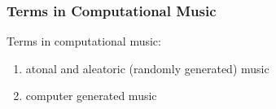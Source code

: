 \subsubsection{\hspace{0.1in} Terms in Computational Music}
\label{compmusicterms}

Terms in computational music: \vspace{-0.3cm}
\begin{enumerate} \itemsep -4pt
\item atonal and aleatoric (randomly generated) music
\item computer generated music
\end{enumerate}

